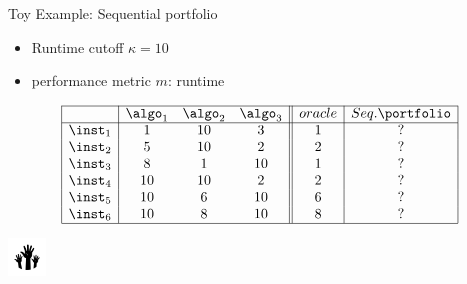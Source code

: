 \begin{frame}[c]{Toy Example: Sequential portfolio}

\begin{itemize}
  \item Runtime cutoff $\kappa = 10$
  \item performance metric $m$: runtime
\end{itemize}


\[
\begin{array}{| r | c  c  c || c | c |}
  \cline{1-6}
      & \algo_1 & \algo_2 & \algo_3 & oracle & Seq. \portfolio\\
  \cline{1-6}
  \inst_1 & 		 1    &         10  &         3    & 1  & ?\\
  \inst_2 &          5    &         10  &  		2 	  & 2 & ?\\
  \inst_3 &          8    &  		1    &         10  & 1 & ?\\
  \inst_4 &         10  &         10  & 		2 	  & 2 & ?\\
  \inst_5 &         10  & 		 6    &         10  & 6 & ?\\
  \inst_6 &         10  &          8    &         10  & 8 & ?\\
  \cline{1-6}
\end{array}
\]

\centering
\includegraphics[height=1cm]{images/hands.png}

\end{frame}
